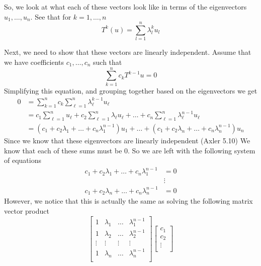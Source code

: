 \documentclass[answers]{exam}
\begin{document}
\begin{questions}
\begin{parts}
\begin{solution}
            So, we look at what each of these vectors look like in terms of the eigenvectors
            $u_1,\dots,u_n$. See that for $k=1,\dots,n$
            \[
                T^k(u) = \sum_{l=1}^n\lambda_l^ku_l
            \]

            Next, we need to show that these vectors are linearly independent. Assume that we have coefficients
            $c_1,\dots,c_n$ such that 
            \[
                \sum_{k=1}^n c_kT^{k-1}u = 0
            \]
            Simplifying this equation, and grouping together based on the eigenvectors we get
            \begin{align*}
                0 &= \sum_{k=1}^n c_k\sum_{\ell=1}^n\lambda_\ell^{k-1}u_\ell\\
                  &= c_1\sum_{\ell=1}^nu_\ell + c_2\sum_{\ell=1}^n\lambda_\ell u_\ell + \dots + c_n\sum_{\ell=1}^n\lambda_\ell^{n-1}u_\ell \\
                  &= (c_1 + c_2\lambda_1 + \dots + c_n\lambda_1^{n-1})u_1 + \dots + (c_1 + c_2\lambda_n + \dots + c_n\lambda_n^{n-1})u_n
            \end{align*}
            Since we know that these eigenvectors are linearly independent (Axler 5.10) We know that each of 
            these sums must be $0$. So we are left with the following system of equations
            \begin{align*}
                c_1 + c_2\lambda_1 + \dots + c_n\lambda_1^{n-1} &= 0\\
                &\vdots\\
                c_1 + c_2\lambda_n + \dots + c_n\lambda_n^{n-1} &= 0
            \end{align*}
            However, we notice that this is actually the same as solving the following matrix vector product
            \[
                \begin{bmatrix}
                    1 & \lambda_1 & \dots & \lambda_1^{n-1} \\
                    1 & \lambda_2 & \dots & \lambda_2^{n-1} \\
                    \vdots&\vdots&\vdots&\vdots\\
                    1 & \lambda_n & \dots & \lambda_n^{n-1} \\
                \end{bmatrix}\begin{bmatrix}
                    c_1\\
                    c_2\\
                    \vdots\\

\end{bmatrix}\]
\end{solution}
\end{parts}
\end{questions}
\end{document}

